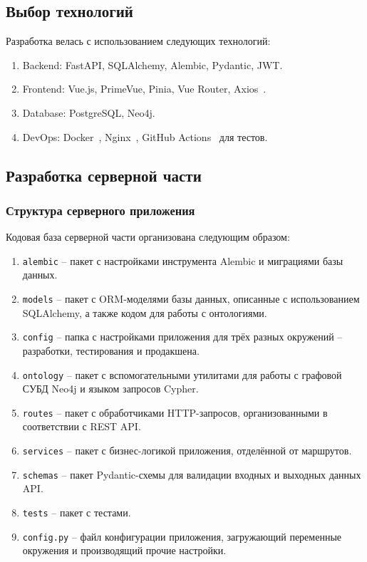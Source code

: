 \subsection{Выбор технологий}

Разработка велась с использованием следующих технологий:
\begin{enumerate}
    \item Backend: FastAPI, SQLAlchemy, Alembic, Pydantic, JWT.
    \item Frontend: Vue.js, PrimeVue, Pinia, Vue Router, Axios~\cite{Library:Axios}.
    \item Database: PostgreSQL, Neo4j.
    \item DevOps: Docker~\cite{Tool:Docker}, Nginx~\cite{Tool:Nginx}, GitHub Actions~\cite{Tool:GitHubActions} для тестов.
\end{enumerate}

\subsection{Разработка серверной части}

\subsubsection{Структура серверного приложения}

Кодовая база серверной части организована следующим образом:

\begin{enumerate}
    \item \texttt{alembic} -- пакет с настройками инструмента Alembic и миграциями базы данных.
    \item \texttt{models} -- пакет с ORM-моделями базы данных, описанные с использованием SQLAlchemy, а также кодом для работы с онтологиями.
    \item \texttt{config} -- папка с настройками приложения для трёх разных окружений -- разработки, тестирования и продакшена.
    \item \texttt{ontology} -- пакет с вспомогательными утилитами для работы с графовой СУБД Neo4j и языком запросов Cypher.
    \item \texttt{routes} -- пакет с обработчиками HTTP-запросов, организованными в соответствии с REST API.
    \item \texttt{services} -- пакет с бизнес-логикой приложения, отделённой от маршрутов.
    \item \texttt{schemas} -- пакет Pydantic-схемы для валидации входных и выходных данных API.
    \item \texttt{tests} -- пакет с тестами.
    \item \texttt{config.py} -- файл конфигурации приложения, загружающий переменные окружения и производящий прочие настройки.
\end{enumerate}

